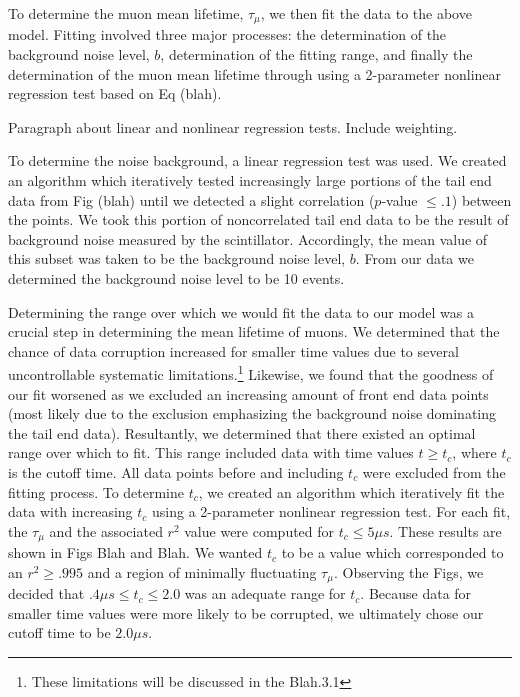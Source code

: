 To determine the muon mean lifetime, $\tau_{\mu}$, we then fit the
data to the above model.  Fitting involved three major processes: the
determination of the background noise level, $b$, determination of the
fitting range, and finally the determination of the muon mean lifetime
through using a 2-parameter nonlinear regression test based on Eq
(blah).

Paragraph about linear and nonlinear regression tests. Include weighting.

To determine the noise background, a linear regression test was used.
We created an algorithm which iteratively tested increasingly large
portions of the tail end data from Fig (blah) until we detected a
slight correlation ($p$-value $\leq .1$) between the points.  We took
this portion of noncorrelated tail end data to be the result of
background noise measured by the scintillator.  Accordingly, the mean
value of this subset was taken to be the background noise level,
$b$. From our data we determined the background noise level to be 10
events.

Determining the range over which we would fit the data to our model
was a crucial step in determining the mean lifetime of muons.  We
determined that the chance of data corruption increased for smaller
time values due to several uncontrollable systematic
limitations.\footnote{These limitations will be discussed in the
Blah.3.1} Likewise, we found that the goodness of our fit worsened as
we excluded an increasing amount of front end data points (most likely
due to the exclusion emphasizing the background noise dominating the
tail end data).  Resultantly, we determined that there existed an
optimal range over which to fit.  This range included data with time
values $t \geq t_{c}$, where $t_{c}$ is the cutoff time.  All data
points before and including $t_{c}$ were excluded from the fitting
process.  To determine $t_{c}$, we created an algorithm which
iteratively fit the data with increasing $t_{c}$ using a 2-parameter
nonlinear regression test.  For each fit, the $\tau_{\mu}$ and the
associated $r^{2}$ value were computed for $t_{c}\leq 5\mu s$.  These
results are shown in Figs Blah and Blah.  We wanted $t_{c}$ to be a
value which corresponded to an $r^{2} \geq .995$ and a region of
minimally fluctuating $\tau_{\mu}$.  Observing the Figs, we decided
that ${.4\mu s \leq t_{c}\leq 2.0}$ was an adequate range for $t_{c}$.
Because data for smaller time values were more likely to be corrupted,
we ultimately chose our cutoff time to be $2.0 \mu s$.


